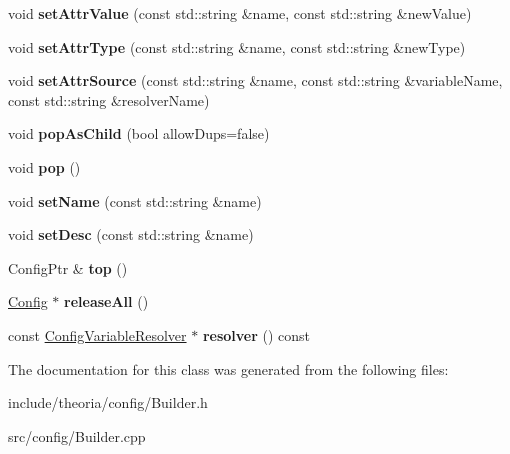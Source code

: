 \begin{DoxyCompactItemize}
\item 
\mbox{\label{classtheoria_1_1config_1_1ConfigBuilder_adcdd668ab4958497e7328b02ad8f8f83}} 
void {\bfseries set\+Attr\+Value} (const std\+::string \&name, const std\+::string \&new\+Value)
\item 
\mbox{\label{classtheoria_1_1config_1_1ConfigBuilder_a019902280637cd43d9a69acb678a5967}} 
void {\bfseries set\+Attr\+Type} (const std\+::string \&name, const std\+::string \&new\+Type)
\item 
\mbox{\label{classtheoria_1_1config_1_1ConfigBuilder_af30b50a47285d06afae1b74edfb4d762}} 
void {\bfseries set\+Attr\+Source} (const std\+::string \&name, const std\+::string \&variable\+Name, const std\+::string \&resolver\+Name)
\item 
\mbox{\label{classtheoria_1_1config_1_1ConfigBuilder_acd995045c0bf17d35da9573cf53ec791}} 
void {\bfseries pop\+As\+Child} (bool allow\+Dups=false)
\item 
\mbox{\label{classtheoria_1_1config_1_1ConfigBuilder_accda8a312be22d56b33adb47d5b266e9}} 
void {\bfseries pop} ()
\item 
\mbox{\label{classtheoria_1_1config_1_1ConfigBuilder_a19eea792ee2bc01c44806d2a5a9f666c}} 
void {\bfseries set\+Name} (const std\+::string \&name)
\item 
\mbox{\label{classtheoria_1_1config_1_1ConfigBuilder_a2582791fc33c6c4e700adbb615bb17a1}} 
void {\bfseries set\+Desc} (const std\+::string \&name)
\item 
\mbox{\label{classtheoria_1_1config_1_1ConfigBuilder_a394d42770a90532be340a8af46868f79}} 
Config\+Ptr \& {\bfseries top} ()
\item 
\mbox{\label{classtheoria_1_1config_1_1ConfigBuilder_a06911a804a22e89101dab7ca3a08b049}} 
\hyperlink{classtheoria_1_1config_1_1Config}{Config} $\ast$ {\bfseries release\+All} ()
\item 
\mbox{\label{classtheoria_1_1config_1_1ConfigBuilder_aa40d918441c9cbc0b60bdcd39551164f}} 
const \hyperlink{classtheoria_1_1config_1_1ConfigVariableResolver}{Config\+Variable\+Resolver} $\ast$ {\bfseries resolver} () const
\end{DoxyCompactItemize}


The documentation for this class was generated from the following files\+:\begin{DoxyCompactItemize}
\item 
include/theoria/config/Builder.\+h\item 
src/config/Builder.\+cpp\end{DoxyCompactItemize}
